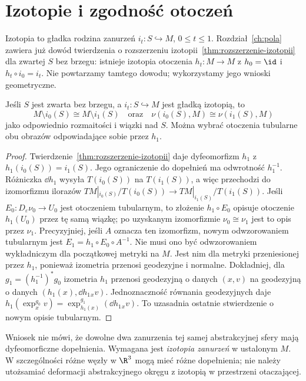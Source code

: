 \section{Izotopie i zgodność otoczeń}
\label{sec:izotopie-otoczen-15}

Izotopia to gładka rodzina zanurzeń
$i_t:S\hookrightarrow M$, $0\leq t\leq1$.
Rozdział~\ref{ch:pola} zawiera
już dowód twierdzenia o rozszerzeniu
izotopii~\ref{thm:rozszerzenie-izotopii}
dla zwartej $S$ bez brzegu:
istnieje izotopia otoczenia
$h_t:M\to M$ z $h_0=\id$
i $h_t\circ i_0=i_t$.
Nie powtarzamy tamtego dowodu;
wykorzystamy jego wnioski geometryczne.

\begin{wniosek}
\label{cor:izotopia-dopelnienia}
Jeśli $S$ jest zwarta bez brzegu,
a $i_t:S\hookrightarrow M$ jest
gładką izotopią, to
\[
 M\setminus i_0(S)\cong M\setminus i_1(S)
 \quad\text{oraz}\quad
 \nu(i_0(S),M)\cong \nu(i_1(S),M)
\]
jako odpowiednio rozmaitości
i wiązki nad $S$. Można wybrać
otoczenia tubularne obu obrazów
odpowiadające sobie przez $h_1$.
\end{wniosek}
\begin{proof}
Twierdzenie~\ref{thm:rozszerzenie-izotopii}
daje dyfeomorfizm $h_1$ z
$h_1(i_0(S))=i_1(S)$.
Jego ograniczenie do dopełnień
ma odwrotność $h_1^{-1}$.
Różniczka $\dd h_1$ wysyła
$T(i_0(S))$ na $T(i_1(S))$,
a więc przechodzi do
izomorfizmu ilorazów
$TM|_{i_0(S)}/T(i_0(S))
\to TM|_{i_1(S)}/T(i_1(S))$.
Jeśli $E_0:D_\varepsilon\nu_0\to U_0$
jest otoczeniem tubularnym,
to złożenie $h_1\circ E_0$
opisuje otoczenie $h_1(U_0)$
przez tę samą wiązkę; po
uzyskanym izomorfizmie $\nu_0\cong\nu_1$
jest to opis przez $\nu_1$. Precyzyjniej, jeśli $A$
oznacza ten izomorfizm, nowym odwzorowaniem tubularnym jest
$E_1=h_1\circ E_0\circ A^{-1}$. Nie musi ono być
odwzorowaniem wykładniczym dla początkowej metryki na $M$.
Jest nim dla metryki przeniesionej przez $h_1$,
ponieważ izometria przenosi geodezyjne i normalne.
Dokładniej, dla $g_1=(h_1^{-1})^*g_0$ izometria $h_1$
przenosi geodezyjną o danych $(x,v)$ na geodezyjną
o danych $(h_1(x),\dd h_1{}_xv)$.
Jednoznaczność równania geodezyjnych daje
$h_1(\exp_x^{g_0}v)
=\exp_{h_1(x)}^{g_1}(\dd h_1{}_xv)$.
To uzasadnia ostatnie stwierdzenie o nowym opisie tubularnym.
\end{proof}

\begin{uwaga}
Wniosek nie mówi, że dowolne dwa
zanurzenia tej samej abstrakcyjnej
sfery mają dyfeomorficzne dopełnienia.
Wymagana jest \emph{izotopia zanurzeń}
w ustalonym $M$. W szczególności
różne węzły w $\R^3$ mogą mieć
różne dopełnienia; nie należy
utożsamiać deformacji abstrakcyjnego
okręgu z izotopią w przestrzeni
otaczającej.
\end{uwaga}

